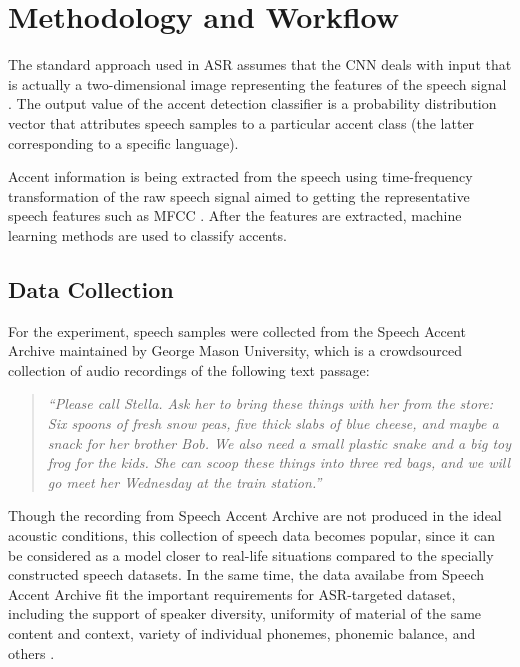 \documentclass[ams]{U-AizuGT}
\begin{document}
\section{Methodology and Workflow}
\label{sec:methods}

The standard approach used in ASR assumes that the CNN deals with input that is actually a two-dimensional image representing the features of the speech signal \cite{Singh:fea}. The output value of the accent detection classifier is a probability distribution vector that attributes speech samples to a particular accent class (the latter corresponding to a specific language). \par
Accent information is being extracted from the speech using time-frequency transformation of the raw speech signal aimed to getting  the representative speech features such as MFCC \cite{Singh:fea}. After the features are extracted, machine learning methods are used to classify accents. 

\subsection{Data Collection}
For the experiment, speech samples were collected from the Speech Accent Archive \cite{George:spe} maintained by George Mason University, which is a crowdsourced collection of audio recordings of the following text passage:
\begin{quotation}{\it “Please call Stella. Ask her to bring these things with her from the store: Six spoons of fresh snow peas, five thick slabs of blue cheese, and maybe a snack for her brother Bob. We also need a small plastic snake and a big toy frog for the kids. She can scoop these things into three red bags, and we will go meet her Wednesday at the train station.”}
\end{quotation}
Though the recording from Speech Accent Archive are not produced in the ideal acoustic conditions, this collection of speech data becomes popular, since it can be considered as a model closer to real-life situations compared to the specially constructed speech datasets. In the same time, the data availabe from Speech Accent Archive fit the important requirements for ASR-targeted dataset, including the support of speaker diversity, uniformity of material of the same content and context, variety of individual phonemes, phonemic balance, and others \cite{Veranika:lang}.
\end{document}

